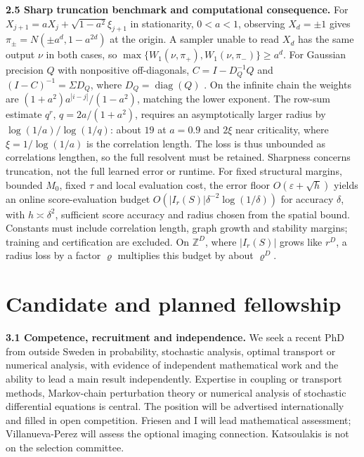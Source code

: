 \documentclass[12pt,a4paper]{article}
\newcommand{\W}{W_1}
\begin{document}
\textbf{2.5 Sharp truncation benchmark and computational consequence.}
For $X_{j+1}=aX_j+\sqrt{1-a^2}\xi_{j+1}$ in stationarity, $0<a<1$, observing $X_d=\pm1$ gives $\pi_\pm=N(\pm a^d,1-a^{2d})$ at the origin. A sampler unable to read $X_d$ has the same output $\nu$ in both cases, so $\max\{\W(\nu,\pi_+),\W(\nu,\pi_-)\}\geq a^d$. For Gaussian precision $Q$ with nonpositive off-diagonals, $C=I-D_Q^{-1}Q$ and $(I-C)^{-1}=\Sigma D_Q$, where $D_Q=\operatorname{diag}(Q)$ \cite{MJW06}. On the infinite chain the weights are $(1+a^2)a^{|i-j|}/(1-a^2)$, matching the lower exponent. The row-sum estimate $q^r$, $q=2a/(1+a^2)$, requires an asymptotically larger radius by $\log(1/a)/\log(1/q)$: about $19$ at $a=0.9$ and $2\xi$ near criticality, where $\xi=1/\log(1/a)$ is the correlation length. The loss is thus unbounded as correlations lengthen, so the full resolvent must be retained. Sharpness concerns truncation, not the full learned error or runtime.
For fixed structural margins, bounded $M_0$, fixed $\tau$ and local evaluation cost, the error floor $O(\varepsilon+\sqrt h)$ yields an online score-evaluation budget $O(|I_r(S)|\delta^{-2}\log(1/\delta))$ for accuracy $\delta$, with $h\asymp\delta^2$, sufficient score accuracy and radius chosen from the spatial bound. Constants must include correlation length, graph growth and stability margins; training and certification are excluded. On $\mathbb Z^D$, where $|I_r(S)|$ grows like $r^D$, a radius loss by a factor $\varrho$ multiplies this budget by about $\varrho^D$.

\section{Candidate and planned fellowship}
\textbf{3.1 Competence, recruitment and independence.}
We seek a recent PhD from outside Sweden in probability, stochastic analysis, optimal transport or numerical analysis, with evidence of independent mathematical work and the ability to lead a main result independently. Expertise in coupling or transport methods, Markov-chain perturbation theory or numerical analysis of stochastic differential equations is central. The position will be advertised internationally and filled in open competition. Friesen and I will lead mathematical assessment; Villanueva-Perez will assess the optional imaging connection. Katsoulakis is not on the selection committee.
\end{document}
